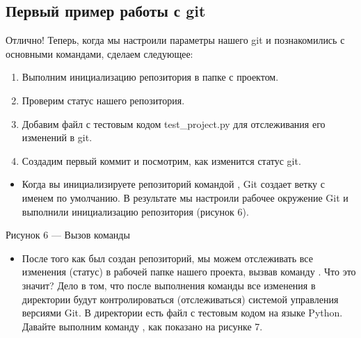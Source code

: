 \documentclass[letterpaper,10pt,russian]{sphinxmanual}
\begin{document}
\subsection{Первый пример работы с git}
\label{\detokenize{educational_materials/git_base/content:id8}}
\sphinxAtStartPar
Отлично! Теперь, когда мы настроили параметры нашего git и познакомились с основными командами, сделаем следующее:
\begin{enumerate}
%
\item {} 
\sphinxAtStartPar
Выполним инициализацию репозитория в папке с проектом.

\item {} 
\sphinxAtStartPar
Проверим статус нашего репозитория.

\item {} 
\sphinxAtStartPar
Добавим файл с тестовым кодом test\_project.py для отслеживания его изменений в git.

\item {} 
\sphinxAtStartPar
Создадим первый коммит и посмотрим, как изменится статус git.

\end{enumerate}
\begin{itemize}
\item {} 
\sphinxAtStartPar
{}
Когда вы инициализируете репозиторий командой , Git создает ветку с именем  по умолчанию. В результате мы настроили рабочее окружение Git и выполнили инициализацию репозитория (рисунок 6).

\end{itemize}

\sphinxAtStartPar
{}

\sphinxAtStartPar
Рисунок 6 — Вызов команды 
\begin{itemize}
\item {} 
\sphinxAtStartPar
{}
После того как был создан репозиторий, мы можем отслеживать все изменения (статус) в рабочей папке нашего проекта, вызвав команду . Что это значит? Дело в том, что после выполнения команды  все изменения в директории  будут контролироваться (отслеживаться) системой управления версиями Git. В директории  есть файл  с тестовым кодом на языке Python. Давайте выполним команду , как показано на рисунке 7.

\end{itemize}
\end{document}
